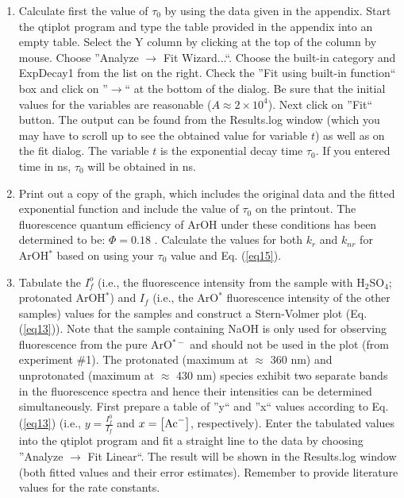 \documentclass[byrevtex,amssymb,aps,pra,floatfix,letterpaper]{revtex4}
\begin{document}
\begin{enumerate}

\item Calculate first the value of $\tau_0$ by using the data given in the appendix. Start the qtiplot program and type the table provided in the appendix into an empty table. Select the Y column by clicking at the top of the column by mouse. Choose ''Analyze $\rightarrow$ Fit Wizard...``. Choose the built-in category and ExpDecay1 from the list on the right. Check the ''Fit using built-in function`` box and click on ''$\rightarrow$`` at the bottom of the dialog. Be sure that the initial values for the variables are reasonable ($A \approx 2\times 10^4$). Next click on ''Fit`` button. The output can be found from the Results.log window (which you may have to scroll up to see the obtained value for variable $t$) as well as on the fit dialog. The variable $t$ is the exponential decay time $\tau_0$. If you entered time in ns, $\tau_0$  will be obtained in ns.

\item Print out a copy of the graph, which includes the original data and the fitted exponential function and include the value of $\tau_0$ on the printout. The fluorescence quantum efficiency of ArOH under these conditions has been determined to be: $\Phi = 0.18$ \cite{MCBANE}. Calculate the values for both $k_r$ and $k_{nr}$ for ArOH$^*$ based on using your $\tau_0$ value and Eq. (\ref{eq15}).

\item Tabulate the $I_f^o$ (i.e., the fluorescence intensity from the sample with H$_2$SO$_4$; protonated ArOH$^*$) and $I_f$ (i.e., the ArO$^*$ fluorescence intensity of the other samples) values for the samples and construct a Stern-Volmer plot (Eq. (\ref{eq13})). Note that the sample containing NaOH is only used for observing fluorescence from the pure ArO$^{*-}$ and should not be used in the plot (from experiment \#1). The protonated (maximum at $\approx$ 360 nm) and unprotonated (maximum at $\approx$ 430 nm) species exhibit two separate bands in the fluorescence spectra and hence their intensities can be determined simultaneously. First prepare a table of ''y`` and ''x`` values according to Eq. (\ref{eq13}) (i.e., $y=\frac{I_f^0}{I_f}$ and $x=\left[\textnormal{Ac}^-\right]$, respectively). Enter the tabulated values into the qtiplot program and fit a straight line to the data by choosing ''Analyze $\rightarrow$ Fit Linear``. The result will be shown in the Results.log window (both fitted values and their error estimates). Remember to provide literature values for the rate constants.


\end{enumerate}
\end{document}
